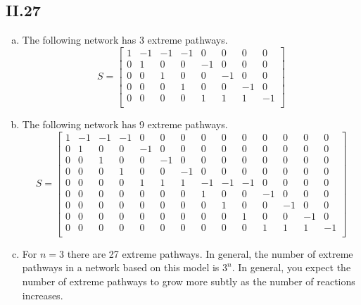 \documentclass[a4paper, 10pt]{article}
\begin{document}
\subsection*{II.27}
\begin{enumerate}[a)]
  \item The following network has 3 extreme pathways. \[ S =
\begin{bmatrix}
1 & -1 & -1 & -1 & 0  & 0  & 0  & 0  \\
0 & 1  & 0  & 0  & -1 & 0  & 0  & 0  \\
0 & 0  & 1  & 0  & 0  & -1 & 0  & 0  \\
0 & 0  & 0  & 1  & 0  & 0  & -1 & 0  \\
0 & 0  & 0  & 0  & 1  & 1  & 1  & -1 \\
\end{bmatrix} \]\newline \vspace{100px}
  \item The following network has 9 extreme pathways. \[ S =
\begin{bmatrix}
1  & -1 & -1 & -1 & 0  & 0  & 0  & 0  & 0  & 0  & 0  & 0  & 0  & 0  \\
0  & 1  & 0  & 0  & -1 & 0  & 0  & 0  & 0  & 0  & 0  & 0  & 0  & 0  \\
0  & 0  & 1  & 0  & 0  & -1 & 0  & 0  & 0  & 0  & 0  & 0  & 0  & 0  \\
0  & 0  & 0  & 1  & 0  & 0  & -1 & 0  & 0  & 0  & 0  & 0  & 0  & 0  \\
0  & 0  & 0  & 0  & 1  & 1  & 1  & -1 & -1 & -1 & 0  & 0  & 0  & 0  \\
0  & 0  & 0  & 0  & 0  & 0  & 0  & 1  & 0  & 0  & -1 & 0  & 0  & 0  \\
0  & 0  & 0  & 0  & 0  & 0  & 0  & 0  & 1  & 0  & 0  & -1 & 0  & 0  \\
0  & 0  & 0  & 0  & 0  & 0  & 0  & 0  & 0  & 1  & 0  & 0  & -1 & 0  \\
0  & 0  & 0  & 0  & 0  & 0  & 0  & 0  & 0  & 0  & 1  & 1  & 1  & -1 \\
\end{bmatrix} \]\newline \vspace{100px}
  \item For $n = 3$ there are 27 extreme pathways. In general, the number of extreme pathways in a network based on this model is $3^n$. In general, you expect the number of extreme pathways to grow more subtly as the number of reactions increases.
\end{enumerate}
\end{document}
